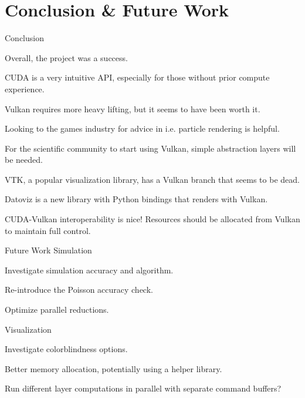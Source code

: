 \section{Conclusion \& Future Work}
\begin{frame}{Conclusion}

\begin{wideitemize}
    \item Overall, the project was a success.
    \item CUDA is a very intuitive API, especially for those without prior compute experience.
    \item Vulkan requires more heavy lifting, but it seems to have been worth it.
    \item Looking to the games industry for advice in i.e. particle rendering is helpful.
    
    \item For the scientific community to start using Vulkan, simple abstraction layers will be needed.
    \begin{wideitemize}
        \item VTK, a popular visualization library, has a Vulkan branch that seems to be dead.
        \item Datoviz is a new library with Python bindings that renders with Vulkan.
    \end{wideitemize}
    
    \item CUDA-Vulkan interoperability is nice! Resources should be allocated from Vulkan to maintain full control.
\end{wideitemize}
\end{frame}

\begin{frame}{Future Work}
    Simulation
    \begin{wideitemize}
        \item Investigate simulation accuracy and algorithm.
        \item Re-introduce the Poisson accuracy check.
        \item Optimize parallel reductions.
    \end{wideitemize}
    \vfill\null
    Visualization
    \begin{wideitemize}
        \item Investigate colorblindness options.
        \item Better memory allocation, potentially using a helper library.
        \item Run different layer computations in parallel with separate command buffers?
    \end{wideitemize}
\end{frame}